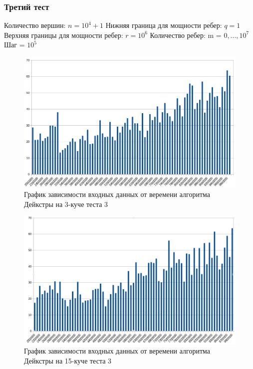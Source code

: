 \documentclass[a4paper, 12pt]{article}
\theoremstyle{definition}
\begin{document}
	\subsubsection{Третий тест}
	Количество вершин: $n = 10^4+1$ \newline
	Нижняя граница для мощности ребер: $q = 1$ \newline
	Верхняя границы для мощности ребер: $r = 10^6$ \newline
	Количество ребер: m = $0,...,10^7$ \newline
	Шаг = $10^5$ \newline
	
	\begin{figure}[!ht]
		\centering
		\includegraphics[width=1\textwidth]{img/res3_3.png}
		\caption{График зависимости входных данных от веремени алгоритма Дейкстры на 3-куче теста 3}
		\label{fig:my_image}
	\end{figure}
	
	\begin{figure}[!ht]
		\centering
		\includegraphics[width=1\textwidth]{img/res3_15.png}
		\caption{График зависимости входных данных от веремени алгоритма Дейкстры на 15-куче теста 3}
		\label{fig:my_image}
	\end{figure}
	
\end{document}
